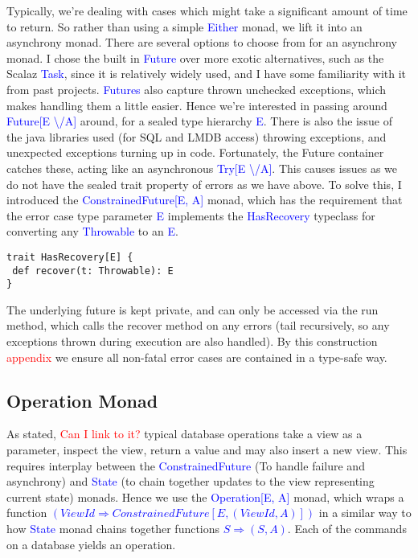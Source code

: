 \documentclass[12pt,a4paper,twoside,openright]{report}
\newcommand\todo[1]{\textcolor{red}{#1}}
\newcommand\codeName[1]{\textcolor{blue}{#1}}
\newcommand\either[0]{\textbackslash/}
\begin{document}
{{Typically, we're dealing with cases which might take a significant amount of time to return. So rather than using a simple \codeName{Either} monad, we lift it into an asynchrony monad. There are several options to choose from for an asynchrony monad. I chose the built in \codeName{Future} over more exotic alternatives, such as the Scalaz \codeName{Task}, since it is relatively widely used, and I have some familiarity with it from past projects. \codeName{Futures} also capture thrown unchecked exceptions, which makes handling them a little easier. Hence we're interested in passing around \codeName{Future[E \either A]} around, for a sealed type hierarchy \codeName{E}. There is also the issue of the java libraries used (for SQL and LMDB access) throwing exceptions, and unexpected exceptions turning up in code. Fortunately, the  Future container catches these, acting like an asynchronous \codeName{Try[E \either A]}. This causes issues as we do not have the sealed trait property of errors as we have above. To solve this, I introduced the \codeName{ConstrainedFuture[E, A]} monad, which has the requirement that the error case type parameter \codeName{E} implements the \codeName{HasRecovery} typeclass for converting any \codeName{Throwable} to an \codeName{E}.

\begin{framed}
	\begin{verbatim}
trait HasRecovery[E] {
 def recover(t: Throwable): E
}
	\end{verbatim}
\end{framed}

The underlying future is kept private, and can only be accessed via the run method, which calls the recover method on any errors (tail recursively, so any exceptions thrown during execution are also handled). By this construction \todo{appendix} we ensure all non-fatal error cases are contained in a type-safe way.

	\subsection{Operation Monad}
	As stated, \todo{Can I link to it?} typical database operations take a view as a parameter, inspect the view, return a value and may also insert a new view. This requires interplay between the \codeName{ConstrainedFuture} (To handle failure and asynchrony) and \codeName{State} (to chain together updates to the view representing current state) monads. Hence we use the \codeName{Operation[E, A]} monad, which wraps a function \codeName{$(ViewId \Rightarrow ConstrainedFuture[E, (ViewId, A)])$} in a similar way to how \codeName{State} monad chains together functions \codeName{$S \Rightarrow (S, A)$}. Each of the commands on a database yields an operation.

}}
\end{document}
